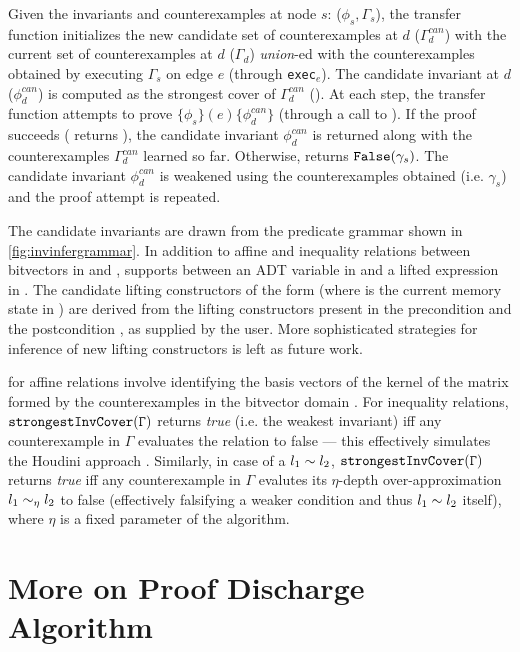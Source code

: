 Given the invariants and counterexamples at node $s$: ($\phi_s,\Gamma_s$),
the transfer function initializes the new candidate set of counterexamples at $d$ ($\Gamma^{can}_{d}$)
with the current set of counterexamples at $d$ ($\Gamma_{d}$) {\em union}-ed with
the counterexamples obtained by executing $\Gamma_s$ on edge $e$ (through {\tt exec}$_e$).
The candidate invariant at $d$ ($\phi^{can}_d$) is computed as the strongest cover
of $\Gamma^{can}_{d}$ ().
At each step, the transfer function attempts to prove $\{\phi_s\} (e) \{\phi^{can}_d\}$
(through a call to ).
If the proof succeeds ( returns ), the candidate invariant $\phi^{can}_d$ is returned along with
the counterexamples $\Gamma^{can}_d$ learned so far.
Otherwise,  returns ${\tt False}(\gamma_s)$.
The candidate invariant $\phi^{can}_d$ is weakened using the counterexamples obtained
(i.e. $\gamma_s$) and the proof attempt is repeated.

The candidate invariants are drawn from the predicate grammar \invgrammar{} shown in \cref{fig:invinfergrammar}.
In addition to affine and inequality relations between bitvectors in \sprog{} and \cprog{},
\invgrammar{} supports \recursiveRelations{} between an ADT variable in \sprog{} and a lifted expression in \cprog{}.
The candidate lifting constructors of the form  (where \mem{} is the current
memory state in \cprog{}) are derived from the lifting constructors
present in the precondition \pre{} and the postcondition \post{}, as supplied by the user.
More sophisticated strategies for inference of new lifting constructors is left as future work.

 for affine relations involve identifying the basis vectors of the kernel of the
matrix formed by the counterexamples in the bitvector domain \cite{esop05,semalign}.
For inequality relations, ${\tt strongestInvCover(\Gamma)}$
returns {\em true} (i.e. the weakest invariant) iff any counterexample in $\Gamma$ evaluates the
relation to false --- this effectively simulates the Houdini approach \cite{houdini}.
Similarly, in case of a \recursiveRelation{} $l_1 \sim{} l_2$, ${\tt strongestInvCover(\Gamma)}$
returns {\em true} iff any counterexample in $\Gamma$ evalutes its $\eta$-depth over-approximation
$l_1 \sim_{\eta} l_2$ to false (effectively falsifying a weaker condition and thus $l_1 \sim{} l_2$ itself), where $\eta$ is a fixed parameter of the algorithm.

\section{More on Proof Discharge Algorithm}
\label{sec:proofalgo}
